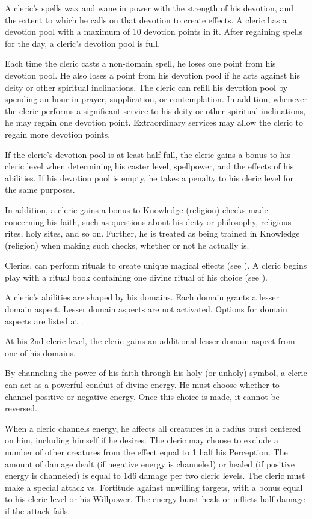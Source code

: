 A cleric's spells wax and wane in power with the strength of his devotion, and the extent to which he calls on that devotion to create effects.
A cleric has a devotion pool with a maximum of 10 devotion points in it.
After regaining spells for the day, a cleric's devotion pool is full.

Each time the cleric casts a non-domain spell, he loses one point from his devotion pool.
He also loses a point from his devotion pool if he acts against his deity or other spiritual inclinations.
The cleric can refill his devotion pool by spending an hour in prayer, supplication, or contemplation.
In addition, whenever the cleric performs a significant service to his deity or other spiritual inclinations, he may regain one devotion point.
Extraordinary services may allow the cleric to regain more devotion points.

If the cleric's devotion pool is at least half full, the cleric gains a  bonus to his cleric level when determining his caster level, spellpower, and the effects of his abilities.
If his devotion pool is empty, he takes a  penalty to his cleric level for the same purposes.

In addition, a cleric gains a  bonus to Knowledge (religion) checks made concerning his faith, such as questions about his deity or philosophy, religious rites, holy sites, and so on.
Further, he is treated as being trained in Knowledge (religion) when making such checks, whether or not he actually is.

Clerics, can perform rituals to create unique magical effects (see ).
A cleric begins play with a ritual book containing one divine ritual of his choice (see ).

A cleric's abilities are shaped by his domains.
Each domain grants a lesser domain aspect.
Lesser domain aspects are not activated.
Options for domain aspects are listed at .

At his 2nd cleric level, the cleric gains an additional lesser domain aspect from one of his domains.

By channeling the power of his faith through his holy (or unholy) symbol, a cleric can act as a powerful conduit of divine energy.
He must choose whether to channel positive or negative energy.
Once this choice is made, it cannot be reversed.

When a cleric channels energy, he affects all creatures in a \areamed radius burst centered on him, including himself if he desires.
The cleric may choose to exclude a number of other creatures from the effect equal to 1 \add half his Perception.
The amount of damage dealt (if negative energy is channeled) or healed (if positive energy is channeled) is equal to 1d6 damage per two cleric levels.
The cleric must make a special attack vs. Fortitude against unwilling targets, with a bonus equal to his cleric level or his Willpower.
The energy burst heals or inflicts half damage if the attack fails.

